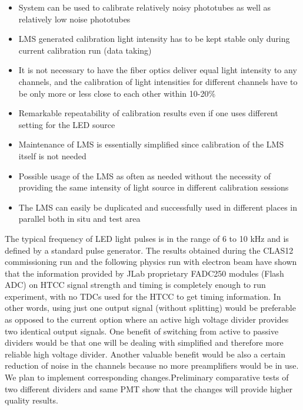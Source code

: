  \begin{itemize}
     \item System can be used to calibrate relatively noisy phototubes as well as relatively low noise phototubes
     \item LMS generated calibration light intensity has to be kept stable only during current calibration run (data taking)
     \item It is not necessary to have the fiber optics deliver equal light intensity to any channels, and the calibration of light intensities for different channels have to be only more or less close to each other within 10-20\%
     \item Remarkable repeatability of calibration results even if one uses different setting for the LED source
     \item Maintenance of LMS is essentially simplified since calibration of the LMS itself is not needed
     \item Possible usage of the LMS as often as needed without the necessity of providing the same intensity of light source in different calibration sessions
     \item The LMS can easily be duplicated and successfully used in different places in parallel both in situ and test area
 \end{itemize}

\indent The typical frequency of LED light pulses is in the range of 6 to 10 kHz and is defined by a standard pulse generator. The results obtained during the CLAS12 commissioning run and the following physics run with electron beam have shown that the information provided by JLab proprietary FADC250 modules (Flash ADC) on HTCC signal strength and timing is completely enough to run experiment, with no TDCs used for the HTCC to get timing information. In other words, using just one output signal (without splitting) would be preferable as opposed to the current option where an active high voltage divider provides two identical output signals. One benefit of switching from active to passive dividers would be that one will be dealing with simplified and therefore more reliable high voltage divider. Another valuable benefit would be also a certain reduction of noise in the channels because no more preamplifiers would be in use. We plan to implement corresponding changes.Preliminary comparative tests of two different dividers and same PMT show that the changes will provide higher quality results.